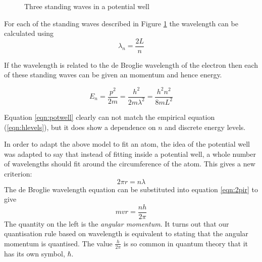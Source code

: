 \documentclass[main.tex]{subfiles}
\begin{document}
\begin{figure}
  \begin{center}
  \end{center}
  \caption{Three standing waves in a potential well}
  \label{fig:potwell}
\end{figure}

For each of the standing waves described in Figure \ref{fig:potwell} the wavelength can be calculated using
\begin{equation}
  \lambda_n = \frac{2L}{n}
\end{equation}

If the wavelength is related to the de Broglie wavelength of the electron then each of these standing waves can be given an momentum and hence energy.

\begin{equation}\label{eqn:potwell}
  E_n = \frac{p^2}{2m} = \frac{h^2}{2m\lambda^2} = \frac{h^2n^2}{8mL^2}
\end{equation}

Equation \ref{eqn:potwell} clearly can not match the empirical equation (\ref{eqn:hlevels}), but it does show a dependence on $n$ and discrete energy levels.


In order to adapt the above model to fit an atom, the idea of the potential well was adapted to say that instead of fitting inside a potential well, a whole number of wavelengths should fit around the circumference of the atom. This gives a new criterion:
\begin{equation}\label{eqn:2pir}
  2\pi r = n\lambda
\end{equation}
The de Broglie wavelength equation can be substituted into equation \ref{eqn:2pir} to give
\begin{equation}\label{eqn:quanL}
  mvr = \frac{nh}{2\pi}
\end{equation}
The quantity on the left is the \emph{angular momentum}. It turns out that our quantisation rule based on wavelength is equivalent to stating that the angular momentum is quantised. The value $\frac{h}{2\pi}$ is so common in quantum theory that it has its own symbol, $\hbar$.
\end{document}

